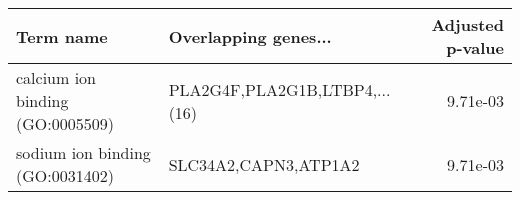 \begin{tabular}{llr}
\toprule
                       Term name &          Overlapping genes... &  Adjusted p-value \\
\midrule
calcium ion binding (GO:0005509) & PLA2G4F,PLA2G1B,LTBP4,...(16) &          9.71e-03 \\
 sodium ion binding (GO:0031402) &          SLC34A2,CAPN3,ATP1A2 &          9.71e-03 \\
\bottomrule
\end{tabular}
